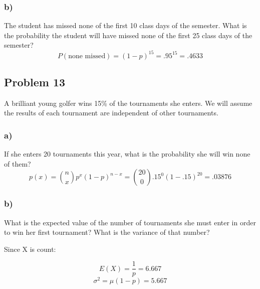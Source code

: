 \documentclass{article}
\begin{document}
\subsubsection*{b)}
The student has missed none of the first 10 class days of the semester. What is the probability the student will have missed none of the first 25 class days of the semester?
\begin{equation}
    P(\text{none missed}) = (1-p)^{15} = .95^{15} = .4633
\end{equation}
\newpage
\subsection*{Problem 13}
A brilliant young golfer wins 15\% of the tournaments she enters. We will assume the results of each tournament are independent of other tournaments.
\subsubsection*{a)}
If she enters 20 tournaments this year, what is the probability she will win none of them?
\begin{equation}
    p(x) = {n \choose x} p^x (1-p)^{n-x} = {20 \choose 0} .15^0 (1-.15)^{20} = .03876
\end{equation}  
\subsubsection*{b)}
What is the expected value of the number of tournaments she must enter in order to win her first tournament? What is the variance of that number?
\begin{center}
    Since X is count:
\end{center}
\begin{equation}
    E(X) = \frac{1}{p} = 6.667
\end{equation}
\begin{equation}
    \sigma^2 = \mu (1-p) = 5.667
\end{equation}
\end{document}

